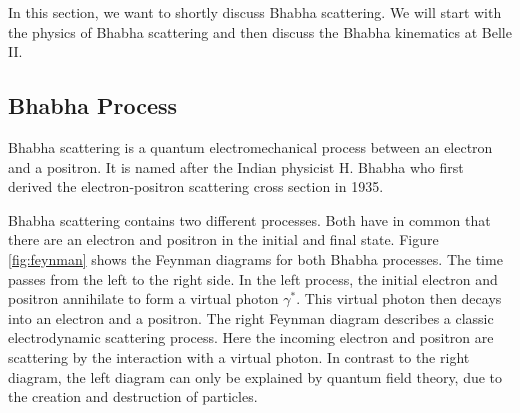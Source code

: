 \documentclass[a4paper,11pt,twosided,final,german,openbib,pdftex,listof=totoc,bibliography=totoc]{scrbook}
\begin{document}
In this section, we want to shortly discuss Bhabha scattering. We will start with the physics of Bhabha scattering and then discuss the Bhabha kinematics at Belle II.
 
\subsection{Bhabha Process}
 \label{sec:BhabhaProcess}
 Bhabha scattering is a quantum electromechanical process between an electron and a positron. It is named after the Indian  physicist H. Bhabha who first derived the electron-positron scattering cross section in 1935.\cite{Bhabha}
 
 Bhabha scattering contains two different processes. Both have in common that there are an electron and positron in the initial and final state. Figure \ref{fig:feynman} shows the Feynman diagrams for both Bhabha processes. The time passes from the left to the right side. In the left process, the initial electron and positron annihilate to form a virtual photon $\gamma^\ast$. This virtual photon then decays into an electron and a positron. The right Feynman diagram describes a classic electrodynamic scattering process. Here the incoming electron and positron are scattering by the interaction with a virtual photon. In contrast to the right diagram, the left diagram can only be explained by quantum field theory, due to the creation and destruction of particles.
 

\end{document}
